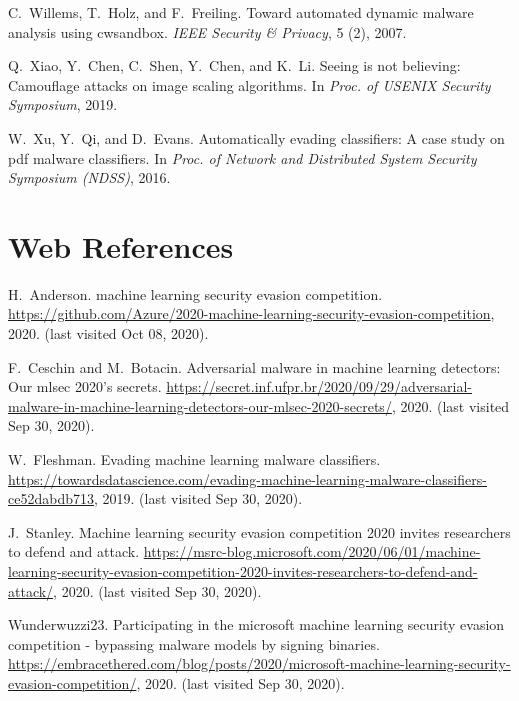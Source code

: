 \documentclass[conference]{IEEEtran}
\begin{document}
{\begin{thebibliography}{47}
	C.~Willems, T.~Holz, and F.~Freiling.
	\newblock Toward automated dynamic malware analysis using cwsandbox.
	\newblock \emph{IEEE Security {\&} Privacy}, 5 (2), 2007.
	
	Q.~Xiao, Y.~Chen, C.~Shen, Y.~Chen, and K.~Li.
	\newblock Seeing is not believing: Camouflage attacks on image 
	scaling
	algorithms.
	\newblock In \emph{Proc. of {USENIX} Security Symposium}, 2019.
	
	W.~Xu, Y.~Qi, and D.~Evans.
	\newblock Automatically evading classifiers: A case study on pdf 
	malware
	classifiers.
	\newblock In \emph{Proc. of Network and Distributed System Security 
	Symposium
		({NDSS})}, 2016.
	
	\vspace{0.25cm}
	\section*{Web References}
	H.~Anderson.
	 machine learning security evasion competition.
	\newblock
	\url{https://github.com/Azure/2020-machine-learning-security-evasion-competition},
	2020.
	\newblock (last visited Oct 08, 2020).

	F.~Ceschin and M.~Botacin.
	\newblock Adversarial malware in machine learning detectors: Our 
	mlsec 2020’s
	secrets.
	\newblock
	\url{https://secret.inf.ufpr.br/2020/09/29/adversarial-malware-in-machine-learning-detectors-our-mlsec-2020-secrets/},
	2020.
	\newblock (last visited Sep 30, 2020).
	
	
	W.~Fleshman.
	\newblock Evading machine learning malware classifiers.
	\newblock
	\url{https://towardsdatascience.com/evading-machine-learning-malware-classifiers-ce52dabdb713},
	2019.
	\newblock (last visited Sep 30, 2020).
	
	
	J.~Stanley.
	\newblock Machine learning security evasion competition 2020 invites
	researchers to defend and attack.
	\newblock
	\url{https://msrc-blog.microsoft.com/2020/06/01/machine-learning-security-evasion-competition-2020-invites-researchers-to-defend-and-attack/},
	2020.
	\newblock (last visited Sep 30, 2020).
	
	
	Wunderwuzzi23.
	\newblock Participating in the microsoft machine learning security 
	evasion
	competition - bypassing malware models by signing binaries.
	\newblock
	\url{https://embracethered.com/blog/posts/2020/microsoft-machine-learning-security-evasion-competition/},
	2020.
	\newblock (last visited Sep 30, 2020).
	
\end{thebibliography}

}
\end{document}
